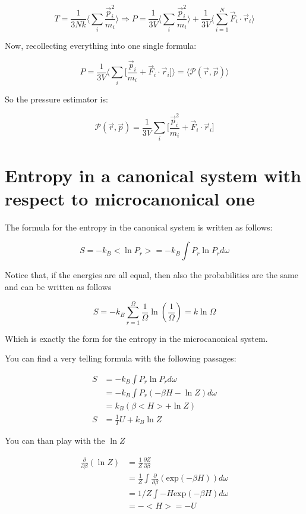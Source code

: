 	$$T = \frac{1}{3Nk}\biggl\langle\sum\limits_i\frac{\vec{p}_i^2}{m_i}\biggr\rangle\Rightarrow P = \frac{1}{3V}\biggl\langle\sum\limits_i\frac{\vec{p}^2_i}{m_i}\biggr\rangle + \frac{1}{3V}\biggl\langle\sum\limits_{i=1}^N\vec{F}_i\cdot\vec{r}_i\biggr\rangle$$

	Now, recollecting everything into one single formula:

	$$P = \frac{1}{3V}\biggl\langle\sum\limits_i\biggl[\frac{\vec{p}_i}{m_i}+ \vec{F}_i\cdot\vec{r}_i\biggr]\biggr\rangle = \langle\mathcal{P}(\vec{r}, \vec{p})\rangle$$

	So the pressure estimator is:

	$$\mathcal{P}(\vec{r}, \vec{p}) = \frac{1}{3V}\sum\limits_i\biggl[\frac{\vec{p}_i^2}{m_i}+ \vec{F}_i\cdot\vec{r}_i\biggr]$$

	\section{Entropy in a canonical system with respect to microcanonical one}

	The formula for the entropy in the canonical system is written as follows:

	$$
	S = - k_B <\ln P_r> = - k_B \int{P_r \ln{P_r} d\omega}
	$$

	Notice that, if the energies are all equal, then also the probabilities are the same and can be written as follows

	$$
	S = - k_B \sum_{r = 1}^\Omega{\frac{1}{\Omega} \ln{\left(\frac{1}{\Omega}\right)}} = k \ln \Omega
	$$

	Which is exactly the form for the entropy in the microcanonical system.


	You can find a very telling formula with the following passages:

	\begin{align*}
		S &= - k_B \int{P_r \ln{P_r} d\omega} \\
		&= - k_B \int{P_r (-\beta H - \ln{Z}) d\omega} \\
		&= k_B (\beta <H> + \ln{Z}) \\
		S &= \frac{1}{T} U + k_B \ln{Z}
	\end{align*}

	You can than play with the $\ln Z$ 

	\begin{align*}
		\frac{\partial}{\partial \beta} (\ln Z) &= \frac{1}{Z} 
		\frac{\partial Z}{\partial \beta} \\ 
		&= \frac{1}{Z} 
		\int{\frac{\partial}{\partial \beta} (\text{exp}(-\beta H)) d\omega} \\
		&= 1/Z \int{-H \text{exp}(-\beta H) d\omega} \\
		&= - <H> = -U
	\end{align*}

